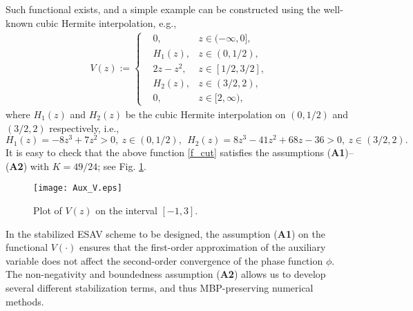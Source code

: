 \documentclass{m2an}
\begin{document}
Such functional exists, and a simple example can be constructed using the well-known cubic Hermite interpolation, e.g.,
\begin{equation}\label{f_cut}
	\begin{array}{l}
		V(z) :=
		\left\{
		\begin{aligned}
			& 0, & z \in (-\infty, 0] ,\\
			& H_1 ( z ),  &  z \in (0,1/2),          \\
			& 2z - z^2,  &    z \in [1/2, 3/2],\\				
			& H_2 ( z ),  &  z \in (3/2,2),       \\
			& 0, &  z \in [2,\infty),
		\end{aligned}
		\right.
	\end{array}
\end{equation}
where $ H_1 ( z ) $ and $ H_2 ( z ) $ be the cubic Hermite interpolation on $ (0,1/2) $ and $ (3/2,2) $ respectively, i.e.,
$$
H_1 ( z ) =  - 8 z^3 + 7 z^2 > 0, ~ z \in (0,1/2), ~~
H_2 ( z ) = 8 z^3 - 41 z^2 + 68 z - 36 > 0, ~ z \in (3/2,2).
$$
It is easy to check that the above function \eqref{f_cut} satisfies the assumptions (\textbf{A1})--(\textbf{A2}) with $ K = 49/24 $; see Fig. \ref{fig_1}.
\begin{figure}[!htbp]
	\vspace{-6pt}
	\centering
	\begin{minipage}[t]{0.6\linewidth}
		\centering
		\texttt{[image: Aux\_V.eps]}
		\caption{ Plot of $ V(z) $ on the interval $ [-1,3]$. }
		\label{fig_1}
	\end{minipage}
	\vspace{-6pt}
\end{figure}
%
\begin{rmrk}
	In the stabilized ESAV scheme to be designed, the assumption (\textbf{A1}) on the functional $ V(\cdot) $ ensures that the first-order approximation of the auxiliary variable does not affect the second-order convergence of the phase function $ \phi $. The non-negativity and boundedness assumption (\textbf{A2}) allows us to develop several different stabilization terms, and thus MBP-preserving numerical methods.
\end{rmrk}

\end{document}
